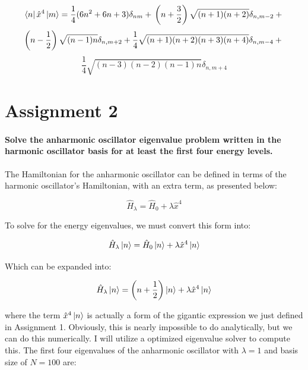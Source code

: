 \documentclass[12pt]{article}
\begin{document}
$$ \bra{n} \hat{x}^4 \ket{m}  =\frac{1}{4} (6n^2 + 6n + 3) \delta_{nm}  +  \\
						 \left( n + \frac{3}{2} \right) \sqrt{ (n+1) (n+2) }   \delta_{n, m-2}   +  \\ $$ $$ 
					 \left(n - \frac{1}{2}\right) \sqrt{ (n-1) n} \delta_{n, m+2}  +  \\ 
						 \frac{1}{4}\sqrt{ (n+1) (n+2) (n+3) (n+4) } \delta_{n, m-4}  + \\ $$ 
						$$ \frac{1}{4}\sqrt{ (n-3) (n-2) (n-1) n } \delta_{n, m+4}$$ 
						
\section{Assignment 2}

\paragraph{Solve the anharmonic oscillator eigenvalue problem written in the harmonic oscillator basis for at least the first four energy levels.}

The Hamiltonian for the anharmonic oscillator can be defined in terms of the harmonic oscillator's Hamiltonian, with an extra term, as presented below:

\begin{equation}
\hat{H}_{\lambda} = \hat{H}_0 + \lambda \hat{x}^4
\end{equation}

To solve for the energy eigenvalues, we must convert this form into:

\begin{equation}
\hat{H}_{\lambda} \ket{n} = \hat{H}_0 \ket{n}+ \lambda \hat{x}^4 \ket{n}
\end{equation}

Which can be expanded into:

\begin{equation}
\hat{H}_{\lambda} \ket{n} = \left( n+ \frac{1}{2} \right) \ket{n}+ \lambda \hat{x}^4 \ket{n}
\end{equation}

where the term $\hat{x}^4 \ket{n}$ is actually a form of the gigantic expression we just defined in Assignment 1. Obviously, this is nearly impossible to do analytically, but we can do this numerically. I will utilize a optimized eigenvalue solver to compute this. The first four eigenvalues of the anharmonic oscillator with $\lambda = 1$ and basis size of $N=100$ are:
\end{document}
